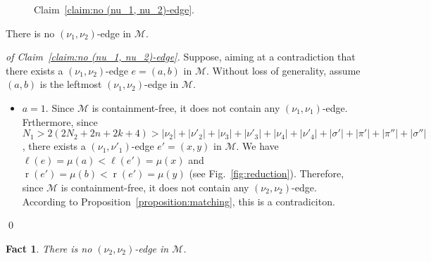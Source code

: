 \documentclass[a4paper,10pt]{llncs}
\DeclareMathOperator{\LEFT}{\ell}
\DeclareMathOperator{\RIGHT}{r}
\newtheorem{fact}{Fact}
\begin{document}
\begin{figure}[t!]
{
    \label{subfig:no (nu_1, nu_2)-edge - 2}}
    \caption{\label{fig:subfig:no (nu_1, nu_2)-edge}%
            Claim~\ref{claim:no (nu_1, nu_2)-edge}.%
            }
  \end{figure}

\begin{claim}
  \label{claim:no (nu_1, nu_2)-edge}
  There is no $(\nu_1, \nu_2)$-edge in $\mathcal{M}$.
\end{claim}

\begin{proof}[of Claim~\ref{claim:no (nu_1, nu_2)-edge}]
  Suppose, aiming at a contradiction that there exists
  a $(\nu_1, \nu_2)$-edge $e = (a, b)$ in $\mathcal{M}$.
  Without loss of generality, assume $(a, b)$ is the leftmost
  $(\nu_1, \nu_2)$-edge in $\mathcal{M}$.
  \begin{itemize}
  \item $a=1$. 
  Since $\mathcal{M}$ is containment-free, it does
  not contain any $(\nu_1, \nu_1)$-edge.
  Frthermore,
  since $N_1 > 2(2N_2 + 2n + 2k + 4) > 
  |\nu_2| + |\nu'_2| + |\nu_3| + |\nu'_3| + |\nu_4| + |\nu'_4|
  + |\sigma'| + |\pi'| + |\pi''| + |\sigma''|$, there exists 
  a $(\nu_1, \nu'_1)$-edge $e' = (x, y)$ in $\mathcal{M}$.
  We have 
  $\LEFT(e) = \mu(a) < \LEFT(e') = \mu(x)$
  and
  $\RIGHT(e') = \mu(b) < \RIGHT(e') = \mu(y)$
  (see Fig.~\ref{fig:reduction}).
  Therefore, since $\mathcal{M}$ is containment-free, it does
  not contain any $(\nu_2, \nu_2)$-edge.
  According to Proposition~\ref{proposition:matching}, this is 
  a contradiciton.
  \end{itemize}
  \qed
\end{proof}

\begin{fact}
  \label{fact:no (nu_2, nu_2)-edge}
  There is no $(\nu_2, \nu_2)$-edge in $\mathcal{M}$.
\end{fact}
\end{document}
